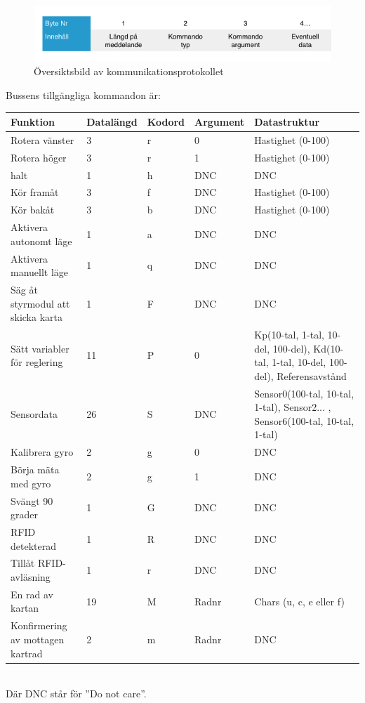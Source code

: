 \documentclass[a4paper,12pt,fleqn]{article}
\begin{document}
\begin{figure}[htp] %
  \begin{center}
  \includegraphics[keepaspectratio=true,scale=0.6]{bilder/Bussprotokoll.png}  %
  \end{center}
  \caption{Översiktsbild av kommunikationsprotokollet} %
  \label{fig:bussprotocol}
\end{figure}

\newpage
Bussens tillgängliga kommandon är:

\begin{tabular}{| p{} | p{} | p{} | p{} | p{} |}
	\hline
	\rowcolor{listinggray}
	\textbf{Funktion} & \textbf{Datalängd} & \textbf{Kodord} & \textbf{Argument} & \textbf{Datastruktur} \\ \hline
	Rotera vänster & 3 & r & 0 & Hastighet (0-100) \\ \hline
	Rotera höger & 3 & r & 1 & Hastighet (0-100) \\ \hline
	halt & 1 & h & DNC & DNC \\ \hline
	Kör framåt & 3 & f & DNC & Hastighet (0-100) \\ \hline
	Kör bakåt & 3 & b & DNC & Hastighet (0-100) \\ \hline
	Aktivera autonomt läge & 1 & a & DNC & DNC \\ \hline
	Aktivera manuellt läge & 1 & q & DNC & DNC \\ \hline
	Säg åt styrmodul att skicka karta & 1 & F & DNC & DNC \\ \hline
	Sätt variabler för reglering & 11 & P & 0 & Kp(10-tal, 1-tal, 10-del, 100-del), Kd(10-tal, 1-tal, 10-del, 100-del), Referensavstånd \\ \hline
	Sensordata & 26 & S & DNC & Sensor0(100-tal, 10-tal, 1-tal), Sensor2... , Sensor6(100-tal, 10-tal, 1-tal) \\ \hline
	Kalibrera gyro & 2 & g & 0 & DNC \\ \hline
	Börja mäta med gyro & 2 & g & 1 & DNC \\ \hline
	Svängt 90 grader & 1 & G & DNC & DNC \\ \hline
	RFID detekterad & 1 & R & DNC & DNC \\ \hline
	Tillåt RFID-avläsning & 1 & r & DNC & DNC \\ \hline
	En rad av kartan & 19 & M & Radnr & Chars (u, c, e eller f) \\ \hline
	Konfirmering av mottagen kartrad & 2 & m & Radnr & DNC \\ \hline
\end{tabular}
~\\
Där DNC står för ''Do not care''.
\newpage
\end{document}
